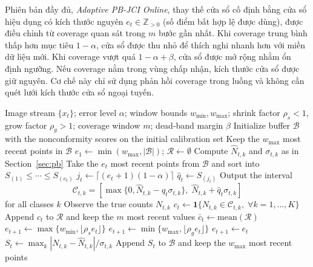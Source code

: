 \documentclass[pdflatex,sn-mathphys-num]{sn-jnl}
\begin{document}
Phiên bản đầy đủ, \emph{Adaptive PB-JCI Online}, thay thế cửa sổ cố định bằng cửa sổ
hiệu dụng có kích thước nguyên \(e_t\in\mathbb{Z}_{>0}\) (số điểm bất hợp lệ được dùng),
được điều chỉnh từ coverage quan sát trong \(m\) bước gần nhất. Khi coverage trung bình thấp hơn mục tiêu \(1-\alpha\), cửa sổ được thu nhỏ
để thích nghi nhanh hơn với miền dữ liệu mới. Khi coverage vượt quá
\(1-\alpha+\beta\), cửa sổ được mở rộng nhằm ổn định ngưỡng. Nếu coverage nằm trong
vùng chấp nhận, kích thước cửa sổ được giữ nguyên. Cơ chế này chỉ sử dụng phản hồi
coverage trong luồng và không cần quét lưới kích thước cửa sổ ngoại tuyến.
\begin{algorithm}[t]
\caption{Adaptive PB-JCI Online}\label{alg:adaptive}
\begin{algorithmic}[1]
\Require Image stream \(\{x_t\}\); error level \(\alpha\); window bounds \(w_{\min},w_{\max}\);
shrink factor \(\rho_s<1\), grow factor \(\rho_g>1\); coverage window \(m\); dead-band margin \(\beta\)
\State Initialize buffer \(\mathcal{B}\) with the nonconformity scores on the initial calibration set
\State Keep the \(w_{\max}\) most recent points in \(\mathcal{B}\)
\State \(e_1 \gets \min(w_{\max},|\mathcal{B}|)\); \quad \(\mathcal{R}\gets\emptyset\)
  \State Compute \(\hat{N}_{t,k}\) and \(\sigma_{t,k}\) as in Section~\ref{sec:pb}
  \State Take the \(e_t\) most recent points from \(\mathcal{B}\) and sort into
  \(S_{(1)}\leq \cdots \leq S_{(e_t)}\)
  \State \(j_t \gets \lceil(e_t+1)(1-\alpha)\rceil\)
  \State \(\hat{q}_t \gets S_{(j_t)}\)
  \State Output the interval
  \[
  \mathcal{C}_{t,k}=
  [\max\{0,\hat{N}_{t,k}-\hat{q}_t\sigma_{t,k}\},\;
   \hat{N}_{t,k}+\hat{q}_t\sigma_{t,k}]
  \]
  for all classes \(k\)
  \State Observe the true counts \(N_{t,k}\)
  \State \(c_t \gets \mathbf{1}\{N_{t,k}\in \mathcal{C}_{t,k},\;\forall k=1,\dots,K\}\)
  \State Append \(c_t\) to \(\mathcal{R}\) and keep the \(m\) most recent values
  \State \(\bar{c}_t \gets \mathrm{mean}(\mathcal{R})\)
    \State \(e_{t+1}\gets \max\{w_{\min},\lfloor\rho_s e_t\rfloor\}\)
    \State \(e_{t+1}\gets \min\{w_{\max},\lfloor\rho_g e_t\rfloor\}\)
  \Else
    \State \(e_{t+1}\gets e_t\)
  \EndIf
  \State \(S_t\gets \max_k |N_{t,k}-\hat{N}_{t,k}|/\sigma_{t,k}\)
  \State Append \(S_t\) to \(\mathcal{B}\) and keep the \(w_{\max}\) most recent points
\EndFor
\end{algorithmic}
\end{algorithm}
\end{document}

